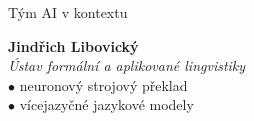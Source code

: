 \documentclass[aspectratio=169,dvipsnames]{beamer}
\begin{document}
\begin{frame}{Tým AI v kontextu}
    \hspace{80pt}\begin{minipage}{70pt}
    \end{minipage}\begin{minipage}{250pt}
        \textbf{Jindřich Libovický} \\
        \textit{Ústav formální a aplikované lingvistiky} \\
        \quad$\bullet$ neuronový strojový překlad \\
        \quad$\bullet$ vícejazyčné jazykové modely
    \end{minipage}

\end{frame}





%
%
%
%
%
%
\end{document}
